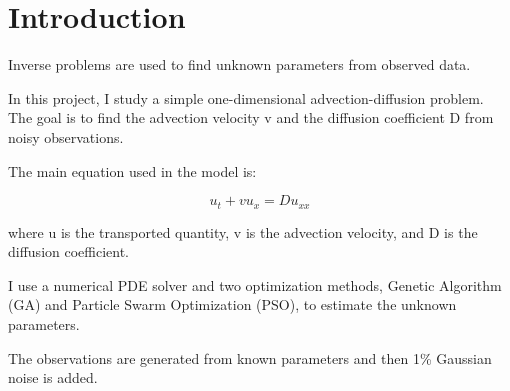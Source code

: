 \section{Introduction}

Inverse problems are used to find unknown parameters from observed data.

In this project, I study a simple one-dimensional advection-diffusion problem. The goal is to find the advection velocity v and the diffusion coefficient D from noisy observations.

The main equation used in the model is:

\[
u_t + v u_x = D u_{xx}
\]

where u is the transported quantity, v is the advection velocity, and D is the diffusion coefficient.

I use a numerical PDE solver and two optimization methods, Genetic Algorithm (GA) and Particle Swarm Optimization (PSO), to estimate the unknown parameters.

The observations are generated from known parameters and then 1\% Gaussian noise is added.